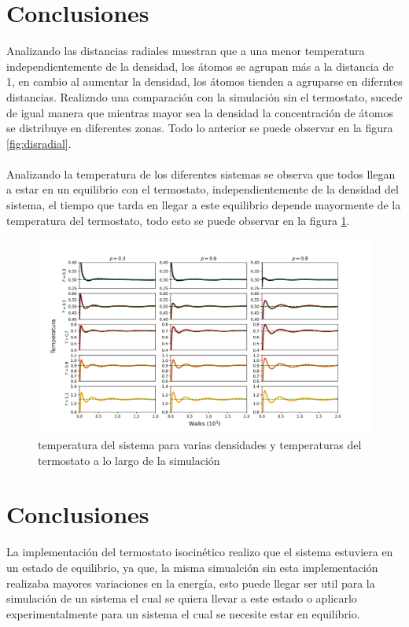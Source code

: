 \documentclass[reprint,amsmath,amssymb,aps,]{revtex4-2}
\begin{document}
\section{Conclusiones}
Analizando las distancias radiales muestran que a una menor temperatura independientemente de la densidad, los átomos se agrupan más a la distancia de 1, en cambio
al aumentar la densidad, los átomos tienden a agruparse en diferntes distancias.
Realizndo una comparación con la simulación sin el termostato, sucede de igual manera que mientras mayor sea la densidad
la concentración de átomos se distribuye en diferentes zonas. Todo lo anterior se puede observar en la figura \ref{fig:disradial}.\\\\

Analizando la temperatura de los diferentes sistemas se observa que todos llegan a estar en un equilibrio con el termostato, independientemente
de la densidad del sistema, el tiempo que tarda en llegar a este equilibrio depende mayormente de la temperatura del termostato, todo esto se puede observar
en la figura \ref{fig:temp}.
\begin{figure}[H]
    \hspace{-0.75cm}
    \includegraphics[scale=0.275]{../Graphics/Temp.png}
    \caption{temperatura del sistema para varias densidades y temperaturas del termostato a lo largo de la simulación}
    \label{fig:temp}
    \end{figure}
\section{Conclusiones}
La implementación del termostato isocinético realizo que el sistema estuviera en un estado de equilibrio, ya que, la misma simualción sin esta implementación
realizaba mayores variaciones en la energía, esto puede llegar ser util para la simulación de un sistema el cual se quiera llevar a este estado o aplicarlo experimentalmente
para un sistema el cual se necesite estar en equilibrio.
\end{document}
